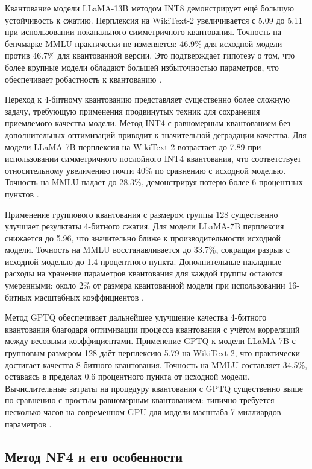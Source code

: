 \documentclass[bachelor, och, coursework]{SCWorks}
\begin{document}
	Квантование модели LLaMA-13B методом INT8 демонстрирует ещё большую устойчивость к сжатию. Перплексия на WikiText-2 увеличивается с 5.09 до 5.11 при использовании поканального симметричного квантования. Точность на бенчмарке MMLU практически не изменяется: 46.9\% для исходной модели против 46.7\% для квантованной версии. Это подтверждает гипотезу о том, что более крупные модели обладают большей избыточностью параметров, что обеспечивает робастность к квантованию \cite{nf4}.
	
	Переход к 4-битному квантованию представляет существенно более сложную задачу, требующую применения продвинутых техник для сохранения приемлемого качества модели. Метод INT4 с равномерным квантованием без дополнительных оптимизаций приводит к значительной деградации качества. Для модели LLaMA-7B перплексия на WikiText-2 возрастает до 7.89 при использовании симметричного послойного INT4 квантования, что соответствует относительному увеличению почти 40\% по сравнению с исходной моделью. Точность на MMLU падает до 28.3\%, демонстрируя потерю более 6 процентных пунктов \cite{gptq}.
	
	Применение группового квантования с размером группы 128 существенно улучшает результаты 4-битного сжатия. Для модели LLaMA-7B перплексия снижается до 5.96, что значительно ближе к производительности исходной модели. Точность на MMLU восстанавливается до 33.7\%, сокращая разрыв с исходной моделью до 1.4 процентного пункта. Дополнительные накладные расходы на хранение параметров квантования для каждой группы остаются умеренными: около 2\% от размера квантованной модели при использовании 16-битных масштабных коэффициентов \cite{sparsegpt}.
	
	Метод GPTQ обеспечивает дальнейшее улучшение качества 4-битного квантования благодаря оптимизации процесса квантования с учётом корреляций между весовыми коэффициентами. Применение GPTQ к модели LLaMA-7B с групповым размером 128 даёт перплексию 5.79 на WikiText-2, что практически достигает качества 8-битного квантования. Точность на MMLU составляет 34.5\%, оставаясь в пределах 0.6 процентного пункта от исходной модели. Вычислительные затраты на процедуру квантования с GPTQ существенно выше по сравнению с простым равномерным квантованием: типично требуется несколько часов на современном GPU для модели масштаба 7 миллиардов параметров \cite{gptq}.
	
	\subsection{Метод NF4 и его особенности}
	
\end{document}
